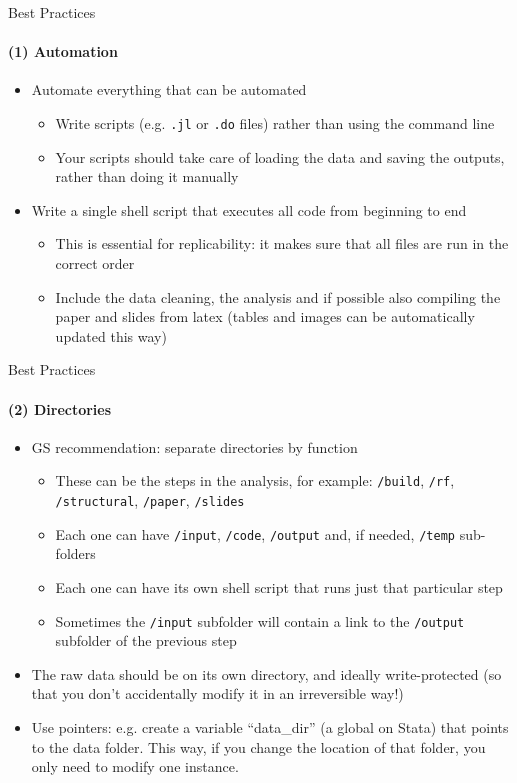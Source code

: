 \documentclass[10pt, aspectratio=169, xcolor=dvipsnames]{beamer}
\let\olditem\item
\renewcommand{\item}{%
\olditem\vspace{0.3em}}
\begin{document}
\begin{frame}[t]{Best Practices}
    \framesubtitle{(1) Automation}

    \normalsize\vspace{0.5em} \begin{itemize}
        \item Automate everything that can be automated \begin{itemize}
            \item Write scripts (e.g. \texttt{.jl} or \texttt{.do} files) rather than using the command line
            \item Your scripts should take care of loading the data and saving the outputs, rather than doing it manually
        \end{itemize}
        \item Write a single shell script that executes all code from beginning to end \begin{itemize}
            \item This is essential for replicability: it makes sure that all files are run in the correct order
            \item Include the data cleaning, the analysis and if possible also compiling the paper and slides from latex (tables and images can be automatically updated this way)
        \end{itemize}
    \end{itemize}
\end{frame}

\begin{frame}[t]{Best Practices}
    \framesubtitle{(2) Directories}

    \normalsize\vspace{0.5em} \begin{itemize}
        \item GS recommendation: separate directories by function \begin{itemize}
            \item These can be the steps in the analysis, for example: \texttt{/build}, \texttt{/rf}, \texttt{/structural}, \texttt{/paper}, \texttt{/slides}
            \item Each one can have \texttt{/input}, \texttt{/code}, \texttt{/output} and, if needed, \texttt{/temp} sub-folders
            \item Each one can have its own shell script that runs just that particular step
            \item Sometimes the \texttt{/input} subfolder will contain a link to the \texttt{/output} subfolder of the previous step
        \end{itemize}
        \item The raw data should be on its own directory, and ideally write-protected (so that you don't accidentally modify it in an irreversible way!)
        \item Use pointers: e.g. create a variable ``data\_dir'' (a global on Stata) that points to the data folder. This way, if you change the location of that folder, you only need to modify one instance.
    \end{itemize}
\end{frame}
\end{document}

